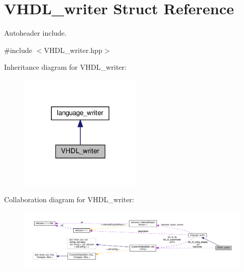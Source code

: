 \hypertarget{structVHDL__writer}{}\section{V\+H\+D\+L\+\_\+writer Struct Reference}
\label{structVHDL__writer}


Autoheader include.  




{\ttfamily \#include $<$V\+H\+D\+L\+\_\+writer.\+hpp$>$}



Inheritance diagram for V\+H\+D\+L\+\_\+writer\+:
\nopagebreak
\begin{figure}[H]
\begin{center}
\leavevmode
\includegraphics[width=165pt]{d5/d68/structVHDL__writer__inherit__graph}
\end{center}
\end{figure}


Collaboration diagram for V\+H\+D\+L\+\_\+writer\+:
\nopagebreak
\begin{figure}[H]
\begin{center}
\leavevmode
\includegraphics[width=350pt]{d0/dbc/structVHDL__writer__coll__graph}
\end{center}
\end{figure}

